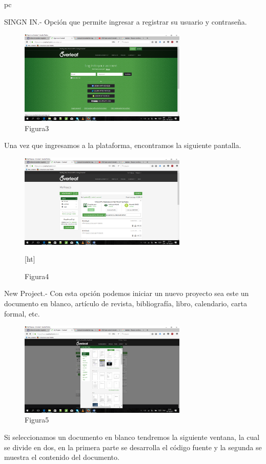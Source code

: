 pc\documentclass[a4paper,12pt,openany]{book}
\begin{document}
\begin{itemize}
SINGN IN.- Opción que permite ingresar a registrar su usuario y contraseña.

\begin{figure}[ht]
  \centering
	\includegraphics[width=8cm]{3.png}
\caption{Figura3}
  \label{fig:ejemplo3}
\end{figure}


Una vez que ingresamos a la plataforma, encontramos la siguiente pantalla.

\begin{figure}[ht]
  \centering
	\includegraphics[width=8cm]{4.png}
\caption{Figura4}[ht]
  \label{fig:ejemplo4}
\end{figure}

New Project.- Con esta opción podemos iniciar un nuevo proyecto sea este un documento en blanco, artículo de revista, bibliografía, libro, calendario, carta formal,  etc.

\begin{figure}[ht]
  \centering[ht]
	\includegraphics[width=8cm]{5.png}
\caption{Figura5}
  \label{fig:ejemplo5}
\end{figure}
Si seleccionamos un documento en blanco tendremos la siguiente ventana, la cual se divide en dos, en la primera parte se desarrolla el código fuente y la segunda se muestra el contenido del documento.  


\end{itemize}
\end{document}

